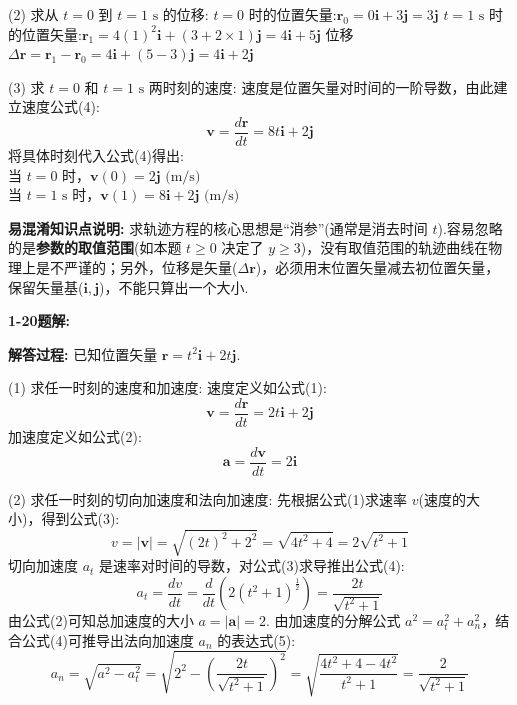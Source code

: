 (2) 求从 $t = 0$ 到 $t = 1\text{ s}$ 的位移:
$t = 0$ 时的位置矢量:$\mathbf{r}_0 = 0\mathbf{i} + 3\mathbf{j} = 3\mathbf{j}$
$t = 1\text{ s}$ 时的位置矢量:$\mathbf{r}_1 = 4(1)^2\mathbf{i} + (3 + 2\times1)\mathbf{j} = 4\mathbf{i} + 5\mathbf{j}$
位移 $\Delta\mathbf{r} = \mathbf{r}_1 - \mathbf{r}_0 = 4\mathbf{i} + (5 - 3)\mathbf{j} = 4\mathbf{i} + 2\mathbf{j}$

(3) 求 $t = 0$ 和 $t = 1\text{ s}$ 两时刻的速度:
速度是位置矢量对时间的一阶导数，由此建立速度公式(4):
\begin{equation}
	\mathbf{v} = \frac{d\mathbf{r}}{dt} = 8t\mathbf{i} + 2\mathbf{j}
\end{equation}
将具体时刻代入公式(4)得出:\\
当 $t = 0$ 时，$\mathbf{v}(0) = 2\mathbf{j} \text{ (m/s)}$ \\
当 $t = 1\text{ s}$ 时，$\mathbf{v}(1) = 8\mathbf{i} + 2\mathbf{j} \text{ (m/s)}$

\textbf{易混淆知识点说明:}
求轨迹方程的核心思想是“消参”(通常是消去时间 $t$).容易忽略的是\textbf{参数的取值范围}(如本题 $t \ge 0$ 决定了 $y \ge 3$)，没有取值范围的轨迹曲线在物理上是不严谨的；另外，位移是矢量($\Delta \mathbf{r}$)，必须用末位置矢量减去初位置矢量，保留矢量基($\mathbf{i}, \mathbf{j}$)，不能只算出一个大小.

\vspace{2em}

\textbf{1-20题解:}


\textbf{解答过程:}
已知位置矢量 $\mathbf{r} = t^2\mathbf{i} + 2t\mathbf{j}$.

(1) 求任一时刻的速度和加速度:
速度定义如公式(1):
\begin{equation}
	\mathbf{v} = \frac{d\mathbf{r}}{dt} = 2t\mathbf{i} + 2\mathbf{j}
\end{equation}
加速度定义如公式(2):
\begin{equation}
	\mathbf{a} = \frac{d\mathbf{v}}{dt} = 2\mathbf{i}
\end{equation}

(2) 求任一时刻的切向加速度和法向加速度:
先根据公式(1)求速率 $v$(速度的大小)，得到公式(3):
\begin{equation}
	v = |\mathbf{v}| = \sqrt{(2t)^2 + 2^2} = \sqrt{4t^2 + 4} = 2\sqrt{t^2+1}
\end{equation}
切向加速度 $a_t$ 是速率对时间的导数，对公式(3)求导推出公式(4):
\begin{equation}
	a_t = \frac{dv}{dt} = \frac{d}{dt}\left(2(t^2+1)^{\frac{1}{2}}\right) = \frac{2t}{\sqrt{t^2+1}}
\end{equation}
由公式(2)可知总加速度的大小 $a = |\mathbf{a}| = 2$.
由加速度的分解公式 $a^2 = a_t^2 + a_n^2$，结合公式(4)可推导出法向加速度 $a_n$ 的表达式(5):
\begin{equation}
	a_n = \sqrt{a^2 - a_t^2} = \sqrt{2^2 - \left(\frac{2t}{\sqrt{t^2+1}}\right)^2} = \sqrt{\frac{4t^2+4-4t^2}{t^2+1}} = \frac{2}{\sqrt{t^2+1}}
\end{equation}


